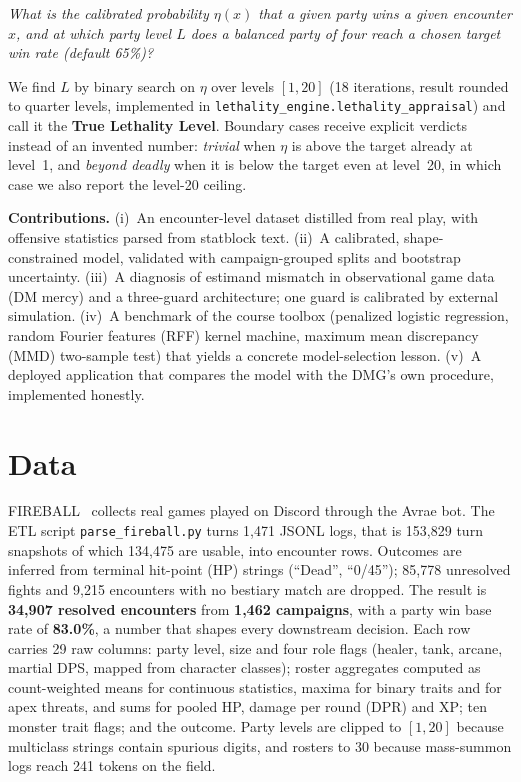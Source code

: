 \documentclass[10pt]{article}
\newcommand{\code}[1]{\texttt{\small #1}}
\begin{document}
\smallskip
\noindent\emph{What is the calibrated probability $\eta(x)$ that a given party wins
a given encounter $x$, and at which party level $L$ does a balanced party of four
reach a chosen target win rate (default 65\%)?}
\smallskip

We find $L$ by binary search on $\eta$ over levels $[1,20]$ (18 iterations, result
rounded to quarter levels, implemented in
\code{lethality\_engine.lethality\_appraisal}) and call it the \textbf{True
Lethality Level}. Boundary cases receive explicit verdicts instead of an invented
number: \emph{trivial} when $\eta$ is above the target already at level~1, and
\emph{beyond deadly} when it is below the target even at level~20, in which case we
also report the level-20 ceiling.

\textbf{Contributions.} (i)~An encounter-level dataset distilled from real play,
with offensive statistics parsed from statblock text. (ii)~A calibrated,
shape-constrained model, validated with campaign-grouped splits and bootstrap
uncertainty. (iii)~A diagnosis of estimand mismatch in observational game data (DM
mercy) and a three-guard architecture; one guard is calibrated by external
simulation. (iv)~A benchmark of the course toolbox (penalized logistic regression,
random Fourier features (RFF) kernel machine, maximum mean discrepancy (MMD) two-sample test) that yields a
concrete model-selection lesson. (v)~A deployed application that compares the model
with the DMG's own procedure, implemented honestly.

\section{Data}
FIREBALL~\cite{fireball} collects real games played on Discord through the Avrae
bot. The ETL script \code{parse\_fireball.py} turns 1{,}471 JSONL logs, that
is 153{,}829 turn snapshots of which 134{,}475 are usable, into encounter rows. Outcomes are inferred from
terminal hit-point (HP) strings (``Dead'', ``0/45''); 85{,}778 unresolved fights and 9{,}215
encounters with no bestiary match are dropped. The result is \textbf{34{,}907
resolved encounters} from \textbf{1{,}462 campaigns}, with a party win base rate of
\textbf{83.0\%}, a number that shapes every downstream decision. Each row carries 29
raw columns: party level, size and four role flags (healer, tank, arcane, martial
DPS, mapped from character classes); roster aggregates computed as count-weighted
means for continuous statistics, maxima for binary traits and for apex threats, and
sums for pooled HP, damage per round (DPR) and XP; ten monster trait flags; and the outcome. Party
levels are clipped to $[1,20]$ because multiclass strings contain spurious digits,
and rosters to 30 because mass-summon logs reach 241 tokens on the field.
\end{document}
